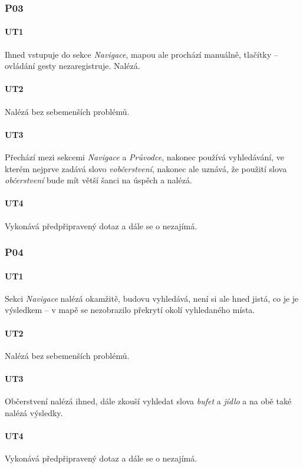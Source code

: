 \subsubsection*{P03}
\paragraph*{UT1}
Ihned vstupuje do sekce \textit{Navigace}, mapou ale prochází manuálně, tlačítky -- ovládání gesty nezaregistruje. Nalézá.
\paragraph*{UT2}
Nalézá bez sebemenších problémů.
\paragraph*{UT3}
Přechází mezi sekcemi \textit{Navigace} a \textit{Průvodce}, nakonec používá vyhledávání, ve kterém nejprve zadává slovo \textit{vobčerstvení}, nakonec ale uznává, že použití slova \textit{občerstvení} bude mít větší šanci na úspěch a nalézá.
\paragraph*{UT4}
Vykonává předpřipravený dotaz a dále se o  nezajímá.

\subsubsection*{P04}
\paragraph*{UT1}
Sekci \textit{Navigace} nalézá okamžitě, budovu vyhledává, není si ale hned jistá, co je je výsledkem -- v mapě se nezobrazilo překrytí okolí vyhledaného místa. 
\paragraph*{UT2}
Nalézá bez sebemenších problémů.
\paragraph*{UT3}
Občerstvení nalézá ihned, dále zkouší vyhledat slova \textit{bufet} a \textit{jídlo} a na obě také nalézá výsledky.
\paragraph*{UT4}
Vykonává předpřipravený dotaz a dále se o  nezajímá.

